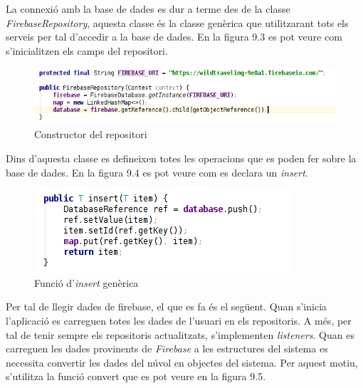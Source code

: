 \begin{itemize}
La connexió amb la base de dades es dur a terme des de la classe \textit{FirebaseRepository}, aquesta classe és la classe genèrica que utilitzarant tots els serveis per tal d'accedir a la base de dades. En la figura 9.3 es pot veure com s'inicialitzen els camps del repositori.

\clearpage

\begin{figure}[!h]
\centering
\includegraphics[scale=0.8]{Figures/db1.png}
\caption{Constructor del repositori}
\end{figure}

Dins d'aquesta classe es defineixen totes les operacions que es poden fer sobre la base de dades. En la figura 9.4 es pot veure com es declara un \textit{insert}.

\begin{figure}[!h]
\centering
\includegraphics[scale=0.8]{Figures/db2.png}
\caption{Funció d'\textit{insert} genèrica}
\end{figure}

Per tal de llegir dades de firebase, el que es fa és el següent. Quan s'inicia l'aplicació es carreguen totes les dades de l'usuari en els repositoris. A més, per tal de tenir sempre els repositoris actualitzats, s'implementen \textit{listeners}. Quan es carreguen les dades provinents de \textit{Firebase} a les estructures del sistema es necessita convertir les dades del núvol en objectes del sistema. Per aquest motiu, s'utilitza la funció convert que es pot veure en la figura 9.5.


\end{itemize}
